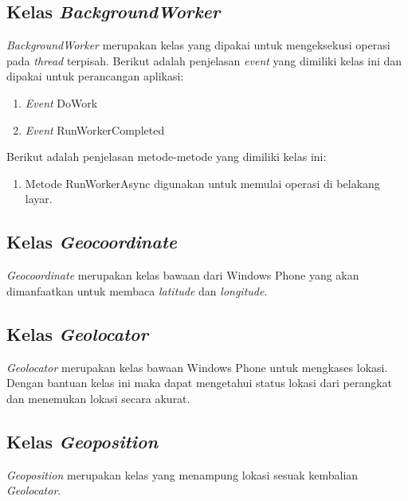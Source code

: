 \subsection{Kelas \textit{BackgroundWorker}}
\label{lab:Kelas BackgroundWorker}
\hspace{0.5cm} \textit{BackgroundWorker} merupakan kelas yang dipakai untuk mengeksekusi operasi pada \textit{thread} terpisah. Berikut adalah penjelasan \textit{event} yang dimiliki kelas ini dan dipakai untuk perancangan aplikasi:
\begin{enumerate}
	\item \textit{Event} DoWork
	\item \textit{Event} RunWorkerCompleted
\end{enumerate}
Berikut adalah penjelasan metode-metode yang dimiliki kelas ini:
\begin{enumerate}
	\item Metode RunWorkerAsync digunakan untuk memulai operasi di belakang layar.
\end{enumerate}

\subsection{Kelas \textit{Geocoordinate}}
\label{lab:Kelas Geocoordinate}
\hspace{0.5cm} \textit{Geocoordinate} merupakan kelas bawaan dari Windows Phone yang akan dimanfaatkan untuk membaca \textit{latitude} dan \textit{longitude}.

\subsection{Kelas \textit{Geolocator}}
\label{lab:Kelas Geolocator}
\hspace{0.5cm} \textit{Geolocator} merupakan kelas bawaan Windows Phone untuk mengkases lokasi. Dengan bantuan kelas ini maka dapat mengetahui status lokasi dari perangkat dan menemukan lokasi secara akurat.

\subsection{Kelas \textit{Geoposition}}
\label{lab:Kelas Geoposition}
\hspace{0.5cm} \textit{Geoposition} merupakan kelas yang menampung lokasi sesuak kembalian \textit{Geolocator}.

